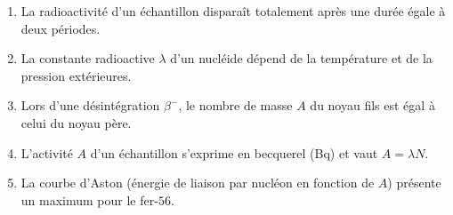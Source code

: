 \documentclass[11pt]{article}
\begin{document}
\begin{exercice}
\begin{enumerate}
    \item La radioactivité d'un échantillon disparaît totalement après une durée égale à deux périodes.
    \item La constante radioactive $\lambda$ d'un nucléide dépend de la température et de la pression extérieures.
    \item Lors d'une désintégration $\beta^-$, le nombre de masse $A$ du noyau fils est égal à celui du noyau père.
    \item L'activité $A$ d'un échantillon s'exprime en becquerel (\si{\becquerel}) et vaut $A = \lambda N$.
    \item La courbe d'Aston (énergie de liaison par nucléon en fonction de $A$) présente un maximum pour le fer-$56$.
\end{enumerate}
\end{exercice}
\end{document}
